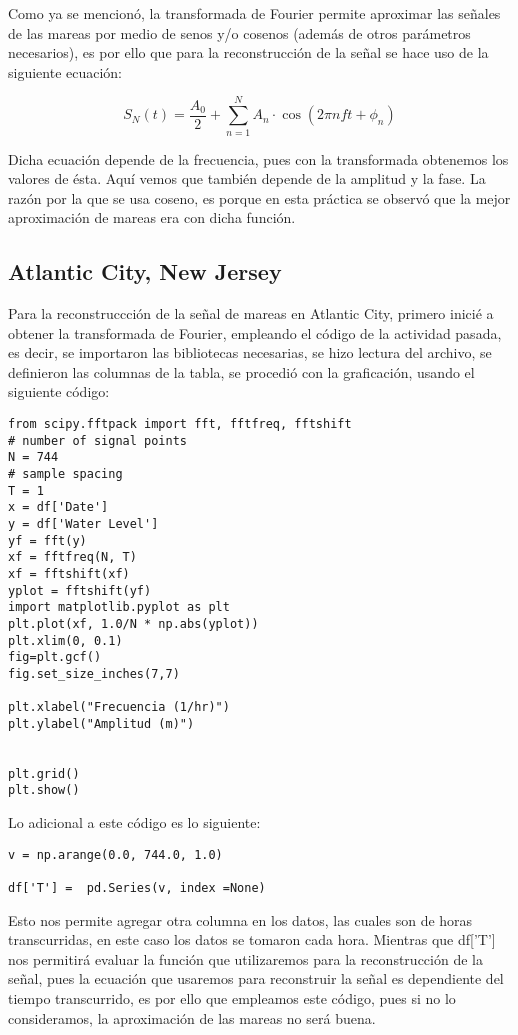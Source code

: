 \documentclass[12pt]{article}
\begin{document}
\begin{doublespace}
Como ya se mencionó, la transformada de Fourier permite aproximar las señales de las mareas por medio de senos y/o cosenos (además de otros parámetros necesarios), es por ello que para la reconstrucción de la señal se hace uso de la siguiente ecuación: 

\begin{equation}
S_N(t) = \frac{A_0}{2} + \sum_{n=1}^{N} A_n\cdot\cos{(2\pi n f t+ \phi_n)}
\end{equation}

Dicha ecuación depende de la frecuencia, pues con la transformada obtenemos los valores de ésta. Aquí vemos que también depende de la amplitud y la fase. La razón por la que se usa coseno, es porque en esta práctica se observó que la mejor aproximación de mareas era con dicha función.

\subsection{Atlantic City, New Jersey}
Para la reconstruccción de la señal de mareas en Atlantic City, primero inicié a obtener la transformada de Fourier, empleando el código de la actividad pasada, es decir, se importaron las bibliotecas necesarias, se hizo lectura del archivo, se definieron las columnas de la tabla, se procedió con la graficación, usando el siguiente código:

\begin{verbatim}
from scipy.fftpack import fft, fftfreq, fftshift
# number of signal points
N = 744
# sample spacing
T = 1
x = df['Date']
y = df['Water Level']
yf = fft(y)
xf = fftfreq(N, T)
xf = fftshift(xf)
yplot = fftshift(yf)
import matplotlib.pyplot as plt
plt.plot(xf, 1.0/N * np.abs(yplot))
plt.xlim(0, 0.1)
fig=plt.gcf()
fig.set_size_inches(7,7)

plt.xlabel("Frecuencia (1/hr)")
plt.ylabel("Amplitud (m)")


plt.grid()
plt.show()

\end{verbatim}

Lo adicional a este código es lo siguiente:

\begin{verbatim}
v = np.arange(0.0, 744.0, 1.0)

df['T'] =  pd.Series(v, index =None)
\end{verbatim}

Esto nos permite agregar otra columna en los datos, las cuales son de horas transcurridas, en este caso los datos se tomaron cada hora. Mientras que df['T'] nos permitirá evaluar la función que utilizaremos para la reconstrucción de la señal, pues la ecuación que usaremos para reconstruir la señal es dependiente del tiempo transcurrido, es por ello que empleamos este código, pues si no lo consideramos, la aproximación de las mareas no será buena.


\end{doublespace}
\end{document}

